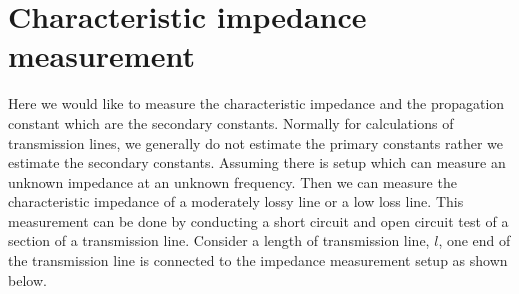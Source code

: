 \section{Characteristic impedance measurement}Here we would like to measure the characteristic impedance and the propagation constant which are the secondary constants. Normally for calculations of transmission lines, we generally do not estimate the primary constants rather we estimate the secondary constants. Assuming there is setup which can measure an unknown impedance at an unknown frequency. Then we can measure the characteristic impedance of a moderately lossy line or a low loss line. This measurement can be done by conducting a short circuit and open circuit test of a section of a transmission line. Consider a length of transmission line, $l$, one end of the transmission line is connected to the impedance measurement setup as shown below.

